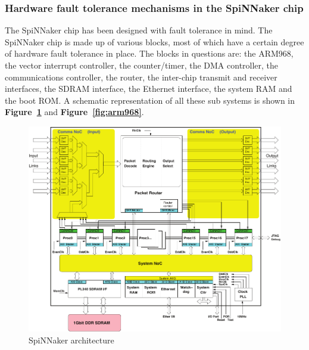 \documentclass[a4paper, 11pt]{article}
\begin{document}

\subsubsection{Hardware fault tolerance mechanisms in the SpiNNaker chip}
The SpiNNaker chip has been designed with fault tolerance in mind. The SpiNNaker chip is made up of various blocks, most of which have a certain degree of hardware fault tolerance in place. The blocks in questions are: the ARM968, the vector interrupt controller, the counter/timer, the DMA controller, the communications controller, the router, the inter-chip transmit and receiver interfaces, the SDRAM interface, the Ethernet interface, the system RAM and the boot ROM. A schematic representation of all these sub systems is shown in \textbf{Figure~\ref{fig:spin_arch}} and \textbf{Figure~\ref{fig:arm968}}.

\begin{figure}[htbp]
	\centering
	\includegraphics[width=0.7\linewidth]{images/spinnaker_architecture.pdf}
	\caption{SpiNNaker architecture}	
	\label{fig:spin_arch}
\end{figure}
\end{document}

